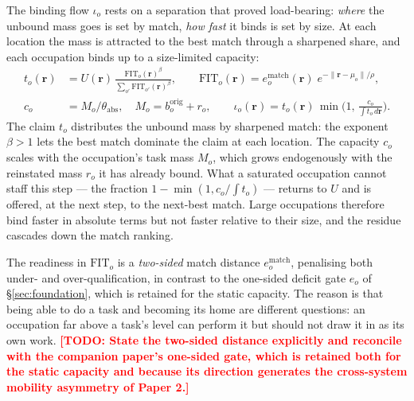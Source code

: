 \documentclass[12pt, a4paper]{article}
\newcommand{\todo}[1]{\textcolor{red}{\textbf{[TODO: #1]}}}
\newcommand{\rr}{\mathbf{r}}
\begin{document}
The binding flow $\iota_o$ rests on a separation that proved
load-bearing: \emph{where} the unbound mass goes is set by match,
\emph{how fast} it binds is set by size. At each location the mass is
attracted to the best match through a sharpened share, and each
occupation binds up to a size-limited capacity:
\begin{align}
t_o(\rr) &= U(\rr)\,
\frac{\mathrm{FIT}_o(\rr)^{\beta}}{\sum_{o'}\mathrm{FIT}_{o'}(\rr)^{\beta}},
\qquad
\mathrm{FIT}_o(\rr) = e_o^{\text{match}}(\rr)\;e^{-\lVert\rr-\mu_o\rVert/\rho},
\label{eq:claim}\\[2pt]
c_o &= M_o/\theta_{\text{abs}}, \quad M_o = b_o^{\text{orig}} + r_o,
\qquad
\iota_o(\rr) = t_o(\rr)\,\min\!\Big(1,\,\frac{c_o}{\int t_o\,d\rr}\Big).
\label{eq:cap}
\end{align}
The claim $t_o$ distributes the unbound mass by sharpened match: the
exponent $\beta>1$ lets the best match dominate the claim at each
location. The capacity $c_o$ scales with the occupation's task mass
$M_o$, which grows endogenously with the reinstated mass $r_o$ it has
already bound. What a saturated occupation cannot staff this step ---
the fraction $1-\min(1,c_o/\!\int t_o)$ --- returns to $U$ and is offered,
at the next step, to the next-best match. Large occupations therefore
bind faster in absolute terms but not faster relative to their size, and
the residue cascades down the match ranking.

The readiness in $\mathrm{FIT}_o$ is a \emph{two-sided} match distance
$e_o^{\text{match}}$, penalising both under- and over-qualification, in
contrast to the one-sided deficit gate $e_o$ of
\S\ref{sec:foundation}, which is retained for the static capacity. The
reason is that being able to do a task and becoming its home are
different questions: an occupation far above a task's level can perform it
but should not draw it in as its own work. \todo{State the two-sided
distance explicitly and reconcile with the companion paper's one-sided
gate, which is retained both for the static capacity and because its
direction generates the cross-system mobility asymmetry of Paper 2.}
\end{document}
